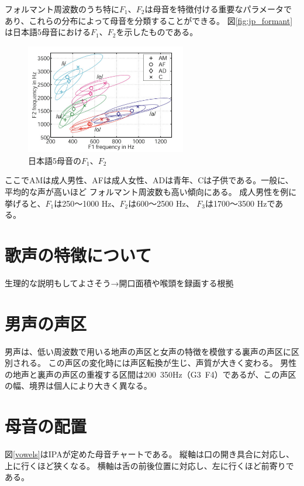\documentclass[10ptj,a4j,dvipdfmx,uplatex, oneside, openany]{jsbook}%
\begin{document}
フォルマント周波数のうち特に$F_1$、$F_2$は母音を特徴付ける重要なパラメータであり、これらの分布によって母音を分類することができる\cite{japanese_vowels}。
図\ref{fig:jp_formant}は日本語5母音における$F_1$、$F_2$を示したものである。

\begin{figure}[htbp]
    \begin{center}
      \includegraphics[clip,width=7.0cm]{5母音.png}
      \caption{日本語5母音の$F_1$、$F_2$\cite{japanese_vowels}}
      \label{jp_formant}
    \end{center}
\end{figure}
ここでAMは成人男性、AFは成人女性、ADは青年、Cは子供である。一般に、平均的な声が高いほど
フォルマント周波数も高い傾向にある。
成人男性を例に挙げると、$F_1$は250〜1000 \si{Hz}、$F_2$は600〜2500 \si{Hz}、
$F_3$は1700〜3500 \si{Hz}である\cite{science}。

\section{歌声の特徴について}
生理的な説明もしてよさそう→開口面積や喉頭を録画する根拠


\section{男声の声区}
男声は、低い周波数で用いる地声の声区と女声の特徴を模倣する裏声の声区に区別される。\cite{science}
この声区の変化時には声区転換が生じ、声質が大きく変わる。
男性の地声と裏声の声区の重複する区間は200~350Hz（G3~F4）であるが、この声区の幅、境界は個人により大きく異なる。

\section{母音の配置}
図\ref{vowels}はIPAが定めた母音チャートである。
縦軸は口の開き具合に対応し、上に行くほど狭くなる。
横軸は舌の前後位置に対応し、左に行くほど前寄りである。
\end{document}
